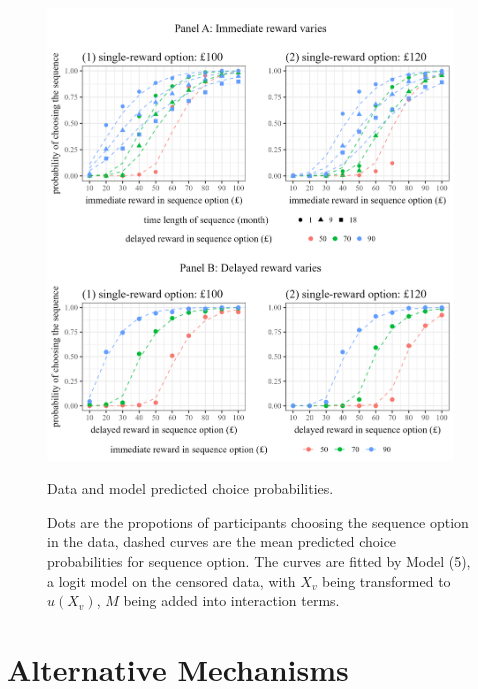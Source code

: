 \documentclass[
  12pt,
]{article}
\begin{document}
\begin{figure}
  \centering
  \includegraphics[width=0.96\textwidth]{figures/fig_grand_pred.png}
  \caption{Data and model predicted choice probabilities.}
  \caption*{\footnotesize Dots are the propotions of participants choosing the sequence option in the data, dashed curves are the mean predicted choice probabilities for sequence option. The curves are fitted by Model (5), a logit model on the censored data, with $X_v$ being transformed to $u(X_v)$, $M$ being added into interaction terms.}
  \label{fig:choice-predicted}
\end{figure}

\hypertarget{alternative-mechanisms}{%
\section{Alternative Mechanisms}\label{alternative-mechanisms}}

\renewcommand\refname{Reference}
  
\end{document}
